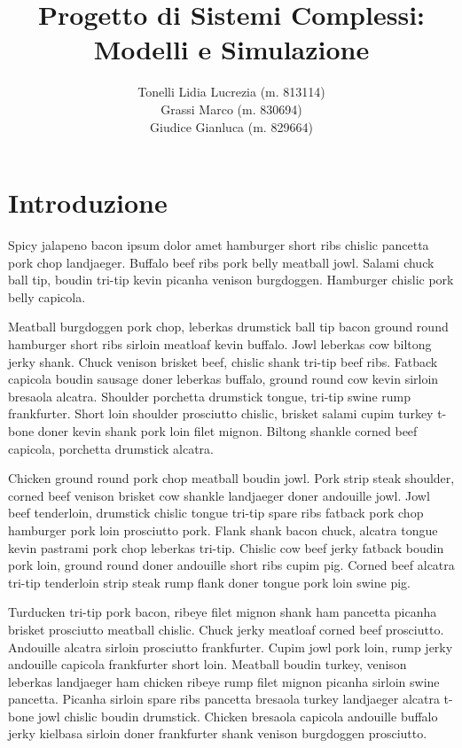 \documentclass[a4paper]{article}
\begin{document}
\author{Tonelli Lidia Lucrezia (m. 813114) \\ Grassi Marco (m. 830694) \\ Giudice Gianluca (m. 829664)}

\title{Progetto di Sistemi Complessi: Modelli e Simulazione}
\maketitle

\tableofcontents

\newpage

\section{Introduzione}

Spicy jalapeno bacon ipsum dolor amet hamburger short ribs chislic pancetta pork chop landjaeger. Buffalo beef ribs pork belly meatball jowl. Salami chuck ball tip, boudin tri-tip kevin picanha venison burgdoggen. Hamburger chislic pork belly capicola.

Meatball burgdoggen pork chop, leberkas drumstick ball tip bacon ground round hamburger short ribs sirloin meatloaf kevin buffalo. Jowl leberkas cow biltong jerky shank. Chuck venison brisket beef, chislic shank tri-tip beef ribs. Fatback capicola boudin sausage doner leberkas buffalo, ground round cow kevin sirloin bresaola alcatra. Shoulder porchetta drumstick tongue, tri-tip swine rump frankfurter. Short loin shoulder prosciutto chislic, brisket salami cupim turkey t-bone doner kevin shank pork loin filet mignon. Biltong shankle corned beef capicola, porchetta drumstick alcatra.

Chicken ground round pork chop meatball boudin jowl. Pork strip steak shoulder, corned beef venison brisket cow shankle landjaeger doner andouille jowl. Jowl beef tenderloin, drumstick chislic tongue tri-tip spare ribs fatback pork chop hamburger pork loin prosciutto pork. Flank shank bacon chuck, alcatra tongue kevin pastrami pork chop leberkas tri-tip. Chislic cow beef jerky fatback boudin pork loin, ground round doner andouille short ribs cupim pig. Corned beef alcatra tri-tip tenderloin strip steak rump flank doner tongue pork loin swine pig.

Turducken tri-tip pork bacon, ribeye filet mignon shank ham pancetta picanha brisket prosciutto meatball chislic. Chuck jerky meatloaf corned beef prosciutto. Andouille alcatra sirloin prosciutto frankfurter. Cupim jowl pork loin, rump jerky andouille capicola frankfurter short loin. Meatball boudin turkey, venison leberkas landjaeger ham chicken ribeye rump filet mignon picanha sirloin swine pancetta. Picanha sirloin spare ribs pancetta bresaola turkey landjaeger alcatra t-bone jowl chislic boudin drumstick. Chicken bresaola capicola andouille buffalo jerky kielbasa sirloin doner frankfurter shank venison burgdoggen prosciutto.
\end{document}
